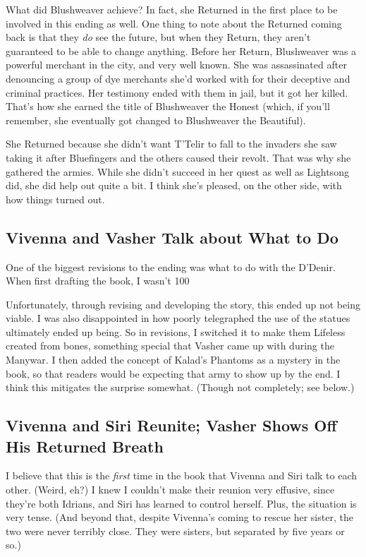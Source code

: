 What did Blushweaver achieve? In fact, she Returned in the first place to be involved in this ending as well. One thing to note about the Returned coming back is that they \textit{do} see the future, but when they Return, they aren’t guaranteed to be able to change anything. Before her Return, Blushweaver was a powerful merchant in the city, and very well known. She was assassinated after denouncing a group of dye merchants she’d worked with for their deceptive and criminal practices. Her testimony ended with them in jail, but it got her killed. That’s how she earned the title of Blushweaver the Honest (which, if you’ll remember, she eventually got changed to Blushweaver the Beautiful).

She Returned because she didn’t want T’Telir to fall to the invaders she saw taking it after Bluefingers and the others caused their revolt. That was why she gathered the armies. While she didn’t succeed in her quest as well as Lightsong did, she did help out quite a bit. I think she’s pleased, on the other side, with how things turned out.

\subsection*{Vivenna and Vasher Talk about What to Do}

One of the biggest revisions to the ending was what to do with the D’Denir. When first drafting the book, I wasn’t 100%

Unfortunately, through revising and developing the story, this ended up not being viable. I was also disappointed in how poorly telegraphed the use of the statues ultimately ended up being. So in revisions, I switched it to make them Lifeless created from bones, something special that Vasher came up with during the Manywar. I then added the concept of Kalad’s Phantoms as a mystery in the book, so that readers would be expecting that army to show up by the end. I think this mitigates the surprise somewhat. (Though not completely; see below.)

\subsection*{Vivenna and Siri Reunite; Vasher Shows Off His Returned Breath}

I believe that this is the \textit{first} time in the book that Vivenna and Siri talk to each other. (Weird, eh?) I knew I couldn’t make their reunion very effusive, since they’re both Idrians, and Siri has learned to control herself. Plus, the situation is very tense. (And beyond that, despite Vivenna’s coming to rescue her sister, the two were never terribly close. They were sisters, but separated by five years or so.)

